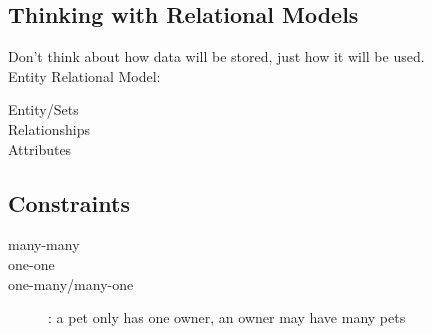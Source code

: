 \documentclass{article}
\begin{document}
\subsection{Thinking with Relational Models}
Don't think about how data will be stored, just how it will be used.\\
Entity Relational Model:
\begin{description}
    \item[ Entity/Sets ]
    \item[ Relationships ]
    \item[ Attributes ]
\end{description}

\subsection{Constraints}
\begin{description}
    \item[many-many]
    \item[one-one]
    \item[one-many/many-one]: a pet only has one owner, an owner may have many
        pets
\end{description}
\end{document}
